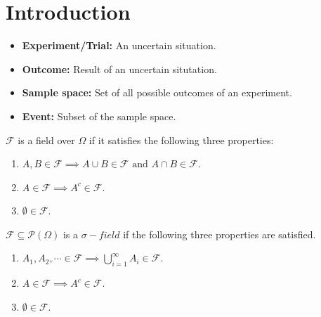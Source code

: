 \section{Introduction}

\begin{itemize}
\item \textbf{Experiment/Trial:} An uncertain situation.\\
\item \textbf{Outcome:} Result of an uncertain situtation.\\
\item \textbf{Sample space:} Set of all possible outcomes of an experiment.\\
\item \textbf{Event:} Subset of the sample space.\\
\end{itemize}

\begin{definition}[Field]
   $\mathscr{F}$ is a field over $\Omega$ if it satisfies the following three properties:
   \begin{enumerate}
        \item $A, B \in \mathscr{F}\implies A\cup B \in \mathscr{F} \text{ and } A\cap B \in \mathscr{F}$.
        \item $A \in \mathscr{F} \implies A^c \in \mathscr{F}$.
        \item $\emptyset \in \mathscr{F}$.
   \end{enumerate}
\end{definition}

\begin{definition}
    $\mathscr{F} \subseteq \mathscr{P}(\Omega)$ is a \textbf{$\sigma -field$} if the following three properties are satisfied.
    \begin{enumerate}
        \item $A_1, A_2, \cdots \in \mathscr{F}\implies \bigcup_{i = 1}^{\infty} A_i \in \mathscr{F}$.
        \item $A \in \mathscr{F} \implies A^c \in \mathscr{F}$.
        \item $\emptyset \in \mathscr{F}$.
    \end{enumerate}
\end{definition}